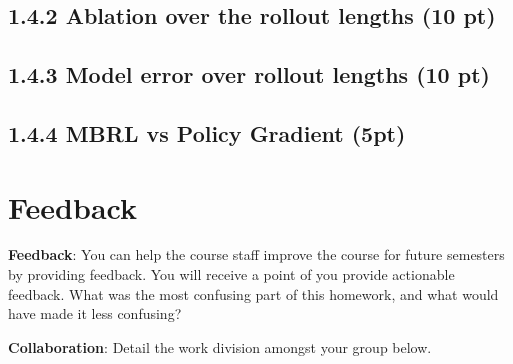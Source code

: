\documentclass[12pt]{article}
\begin{document}
\subsection*{1.4.2 Ablation over the rollout lengths (10 pt)}

\begin{tcolorbox}[fit,height=30em, width=40em, blank, borderline={1pt}{1pt},nobeforeafter]
\begin{center}
\end{center}
\end{tcolorbox}

\subsection*{1.4.3 Model error over rollout lengths (10 pt)}

\begin{tcolorbox}[fit,height=30em, width=40em, blank, borderline={1pt}{1pt},nobeforeafter]
\begin{center}
\end{center}
\end{tcolorbox}

\subsection*{1.4.4 MBRL vs Policy Gradient (5pt)}

\begin{tcolorbox}[fit,height=30em, width=40em, blank, borderline={1pt}{1pt},nobeforeafter]
\begin{center}
\end{center}
\end{tcolorbox}

\clearpage
\section*{Feedback}

\textbf{Feedback}: You can help the course staff improve the course for future semesters by providing feedback. You will receive a point of you provide actionable feedback. What was the most confusing part of this homework, and what would have made it less confusing?
\begin{solution}[height=4cm]
\end{solution}

\textbf{Collaboration}: Detail the work division amongst your group below.
\begin{solution}[height=4cm]
\end{solution}
\end{document}
